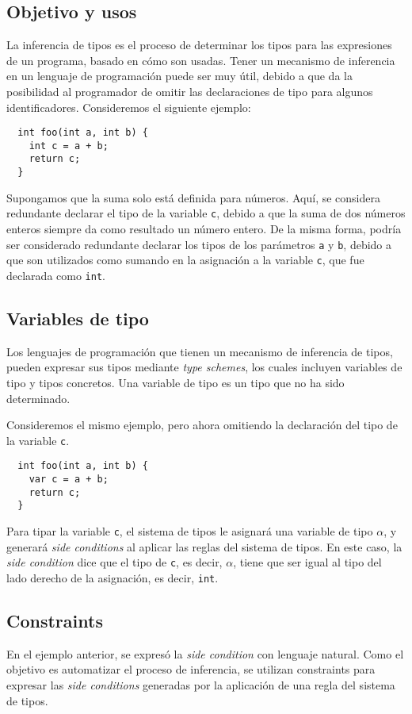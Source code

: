 \subsection{Objetivo y usos}
La inferencia de tipos es el proceso de determinar los tipos para las expresiones de un programa, basado en cómo son usadas. Tener un mecanismo de inferencia en un lenguaje de programación puede ser muy útil, debido a que da la posibilidad al programador de omitir las declaraciones de tipo para algunos identificadores. Consideremos el siguiente ejemplo:

\begin{lstlisting}
  int foo(int a, int b) {
    int c = a + b;
    return c;
  }
\end{lstlisting}

Supongamos que la suma solo está definida para números. Aquí, se considera redundante declarar el tipo de la variable \texttt{c}, debido a que la suma de dos números enteros siempre da como resultado un número entero. De la misma forma, podría ser considerado redundante declarar los tipos de los parámetros \texttt{a} y \texttt{b}, debido a que son utilizados como sumando en la asignación a la variable \texttt{c}, que fue declarada como \texttt{int}.

\subsection{Variables de tipo} \label{schemes}
Los lenguajes de programación que tienen un mecanismo de inferencia de tipos, pueden expresar sus tipos mediante \textit{type schemes}, los cuales incluyen variables de tipo y tipos concretos. Una variable de tipo es un tipo que no ha sido determinado.

Consideremos el mismo ejemplo, pero ahora omitiendo la declaración del tipo de la variable \texttt{c}.

\begin{lstlisting}
  int foo(int a, int b) {
    var c = a + b;
    return c;
  }
\end{lstlisting}

Para tipar la variable \texttt{c}, el sistema de tipos le asignará una variable de tipo $\alpha$, y generará \textit{side conditions} al aplicar las reglas del sistema de tipos. En este caso, la \textit{side condition} dice que el tipo de \texttt{c}, es decir, $\alpha$, tiene que ser igual al tipo del lado derecho de la asignación, es decir, \texttt{int}.

\subsection{Constraints} \label{constraints}
En el ejemplo anterior, se expresó la \textit{side condition} con lenguaje natural. Como el objetivo es automatizar el proceso de inferencia, se utilizan constraints para expresar las \textit{side conditions} generadas por la aplicación de una regla del sistema de tipos.

